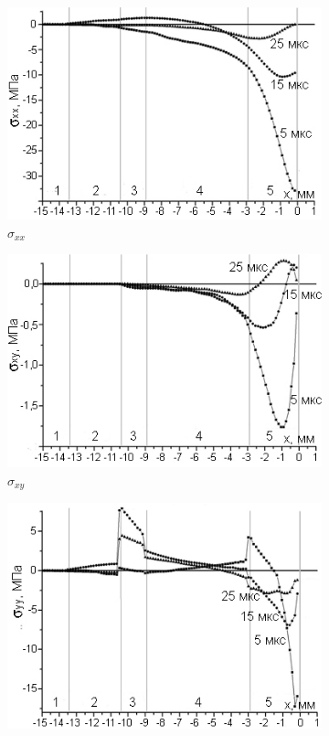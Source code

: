 \begin{figure}[H]
\centering
\begin{subfigure}[b]{0.3\textwidth}
\centering
\includegraphics[width=\textwidth]{png/cranium/2d-sxx-1d.png}
\caption{$\sigma_{xx}$}
\end{subfigure}
\begin{subfigure}[b]{0.3\textwidth}
\centering
\includegraphics[width=\textwidth]{png/cranium/2d-sxy-1d.png}
\caption{$\sigma_{xy}$}
\end{subfigure}
\begin{subfigure}[b]{0.3\textwidth}
\centering
\includegraphics[width=\textwidth]{png/cranium/2d-syy-1d.png}

\end{subfigure}
\end{figure}
